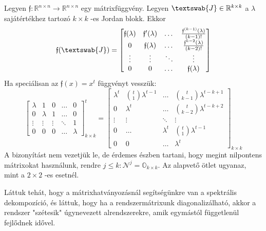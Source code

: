 \documentclass[14p]{article}
\begin{document}
Legyen $\mathfrak{f} : \mathbb{R}^{n \times n} \rightarrow \mathbb{R}^{n \times n}$ egy mátrixfüggvény. Legyen $\textswab{J} \in \mathbb{R}^{k \times k}$ a $\lambda$ sajátértékhez tartozó $k \times k$ -es Jordan blokk. Ekkor
\[
		\mathfrak{f}(\textswab{J}) =
		\begin{bmatrix}
		\mathfrak{f}(\lambda) & \mathfrak{f}'(\lambda) & \dots & \frac{\mathfrak{f}^{(k-1)}(\lambda)}{(k-1)!} \\
		0 & \mathfrak{f}(\lambda) & \dots & \frac{\mathfrak{f}^{k-2}(\lambda)}{(k-2)!} \\
		\vdots & \vdots & \ddots & \vdots \\
		0 & 0 & \dots &  \mathfrak{f}(\lambda)
		\end{bmatrix}
\]
Ha speciálisan az $\mathfrak{f}(x) = x^t$ függvényt vesszük:
\[
		\begin{bmatrix}
		\lambda & 1 & 0 & \dots & 0 \\
		0 & \lambda & 1 & \dots & 0 \\
		\vdots & \vdots & \vdots & \ddots & 1\\ 
		0 & 0 & 0 & \dots & \lambda
		\end{bmatrix}^t_{k \times k}
		=
		\begin{bmatrix}
		\lambda^t & {t \choose 1} \lambda^{t-1} & \dots & {t \choose k-1} \lambda^{t-k+1} \\
		0 & \lambda^t & \dots & {t \choose k-2} \lambda^{t-k+2} \\
		\vdots & \vdots & \ddots & \vdots  \\
		0 & \dots & \lambda^t & {t \choose 1} \lambda^{t-1} \\
		0 & 0 & \dots & \lambda^t
		\end{bmatrix}_{k \times k}
\]
A bizonyítást nem vezetjük le, de érdemes észben tartani, hogy megint nilpontens mátrixokat használunk, rendre $ j \leq k \colon \mathcal{N}^j = \mathbb{O}_{k \times k}$. Az alapvető ötlet ugyanaz, mint a $2 \times 2$ -es esetnél.

\hrulefill

Láttuk tehát, hogy a mátrixhatványozásnál segítségünkre van a spektrális dekompozíció, és láttuk, hogy ha a rendszermátrixunk diagonalizálható, akkor a rendszer "szétesik" úgynevezett alrendszerekre, amik egymástól függetlenül fejlődnek idővel.
\end{document}
